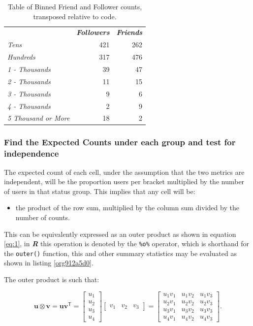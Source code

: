 \documentclass[11pt]{article}
\begin{document}
\begin{table}[htbp]
\caption{\label{tab:org6ff777d}Table of Binned Friend and Follower counts, transposed relative to code.}
\centering
\begin{tabular}{lrr}
 & \textbf{\textbf{\emph{Followers}}} & \textbf{\textbf{\emph{Friends}}}\\
\emph{Tens} & 421 & 262\\
\emph{Hundreds} & 317 & 476\\
\emph{1 - Thousands} & 39 & 47\\
\emph{2 - Thousands} & 11 & 15\\
\emph{3 - Thousands} & 9 & 6\\
\emph{4 - Thousands} & 2 & 9\\
\emph{5 Thousand or More} & 18 & 2\\
\end{tabular}
\end{table}

\subsubsection{Find the Expected Counts under each group and test for independence}
\label{sec:orgffb5c33}
The expected count of each cell, under the assumption that the two metrics are
independent, will be the proportion users per bracket multiplied by the number
of users in that status group. This implies that any cell will be:

\begin{itemize}
\item the product of the row sum, multiplied by the column sum divided by the number of counts.
\end{itemize}

This can be equivalently expressed as an outer product as shown in equation
\eqref{eq:1}, in \textbf{\emph{R}} this operation is denoted by the \texttt{\%o\%} operator, which is
shorthand for the \texttt{outer()} function, this and other summary statistics may be
evaluated as shown in listing \ref{org912a5d0}.

The outer product is such that:


$$
\mathbf{u} \otimes \mathbf {v} =\mathbf {u} \mathbf {v} ^{\textsf {T}}={\begin{bmatrix}u_{1}\\u_{2}\\u_{3}\\u_{4}\end{bmatrix}}{\begin{bmatrix}v_{1}&v_{2}&v_{3}\end{bmatrix}}={\begin{bmatrix}u_{1}v_{1}&u_{1}v_{2}&u_{1}v_{3}\\u_{2}v_{1}&u_{2}v_{2}&u_{2}v_{3}\\u_{3}v_{1}&u_{3}v_{2}&u_{3}v_{3}\\u_{4}v_{1}&u_{4}v_{2}&u_{4}v_{3}\end{bmatrix}}.
$$
\end{document}
